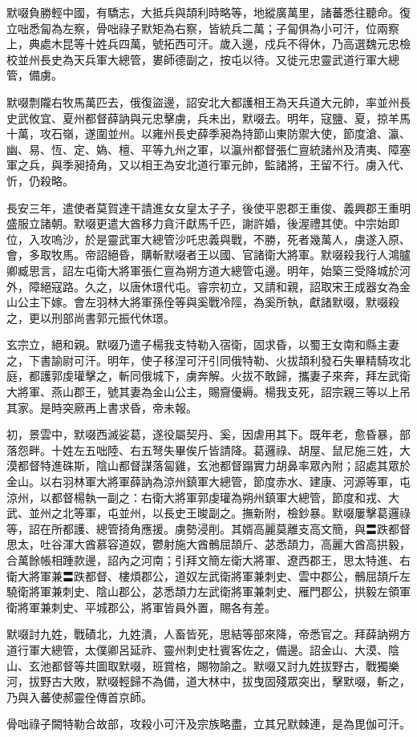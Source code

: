 \begin{pinyinscope}
 默啜負勝輕中國，有驕志，大抵兵與頡利時略等，地縱廣萬里，諸蕃悉往聽命。復立咄悉匐為左察，骨咄祿子默矩為右察，皆統兵二萬；子匐俱為小可汗，位兩察上，典處木昆等十姓兵四萬，號拓西可汗。歲入邊，戍兵不得休，乃高選魏元忠檢校並州長史為天兵軍大總管，婁師德副之，按屯以待。又徙元忠靈武道行軍大總管，備虜。



 默啜剽隴右牧馬萬匹去，俄復盜邊，詔安北大都護相王為天兵道大元帥，率並州長史武攸宜、夏州都督薛訥與元忠擊虜，兵未出，默啜去。明年，寇鹽、夏，掠羊馬十萬，攻石嶺，遂圍並州。以雍州長史薛季昶為持節山東防禦大使，節度滄、瀛、幽、易、恆、定、媯、檀、平等九州之軍，以瀛州都督張仁亶統諸州及清夷、障塞軍之兵，與季昶掎角，又以相王為安北道行軍元帥，監諸將，王留不行。虜入代、忻，仍殺略。



 長安三年，遣使者莫賀達干請進女女皇太子子，後使平恩郡王重俊、義興郡王重明盛服立諸朝。默啜更遣大酋移力貪汗獻馬千匹，謝許婚，後渥禮其使。中宗始即位，入攻嗚沙，於是靈武軍大總管沙吒忠義與戰，不勝，死者幾萬人，虜遂入原、會，多取牧馬。帝詔絕昏，購斬默啜者王以國、官諸衛大將軍。默啜殺我行人鴻臚卿臧思言，詔左屯衛大將軍張仁亶為朔方道大總管屯邊。明年，始築三受降城於河外，障絕寇路。久之，以唐休璟代屯。睿宗初立，又請和親，詔取宋王成器女為金山公主下嫁。會左羽林大將軍孫佺等與奚戰冷陘，為奚所執，獻諸默啜，默啜殺之，更以刑部尚書郭元振代休璟。



 玄宗立，絕和親。默啜乃遣子楊我支特勒入宿衛，固求昏，以蜀王女南和縣主妻之，下書諭尉可汗。明年，使子移涅可汗引同俄特勒、火拔頡利發石失畢精騎攻北庭，都護郭虔瓘擊之，斬同俄城下，虜奔解。火拔不敢歸，攜妻子來奔，拜左武衛大將軍、燕山郡王，號其妻為金山公主，賜齎優縟。楊我支死，詔宗親三等以上吊其家。是時突厥再上書求昏，帝未報。



 初，景雲中，默啜西滅娑葛，遂役屬契丹、奚，因虐用其下。既年老，愈昏暴，部落怨畔。十姓左五咄陸、右五弩失畢俟斤皆請降。葛邏祿、胡屋、鼠尼施三姓，大漠都督特進硃斯，陰山都督謀落匐雞，玄池都督蹋實力胡鼻率眾內附；詔處其眾於金山。以右羽林軍大將軍薛訥為涼州鎮軍大總管，節度赤水、建康、河源等軍，屯涼州，以都督楊執一副之：右衛大將軍郭虔瓘為朔州鎮軍大總管，節度和戎、大武、並州之北等軍，屯並州，以長史王晙副之。撫新附，檢鈔暴。默啜屢擊葛邏祿等，詔在所都護、總管掎角應援。虜勢浸削。其婿高麗莫離支高文簡，與〓跌都督思太，吐谷渾大酋慕容道奴，鬱射施大酋鶻屈頡斤、苾悉頡力，高麗大酋高拱毅，合萬餘帳相踵款邊，詔內之河南；引拜文簡左衛大將軍、遼西郡王，思太特進、右衛大將軍兼〓跌都督、樓煩郡公，道奴左武衛將軍兼刺史、雲中郡公，鶻屈頡斤左驍衛將軍兼刺史、陰山郡公，苾悉頡力左武衛將軍兼刺史、雁門郡公，拱毅左領軍衛將軍兼刺史、平城郡公，將軍皆員外置，賜各有差。



 默啜討九姓，戰磧北，九姓潰，人畜皆死，思結等部來降，帝悉官之。拜薛訥朔方道行軍大總管，太僕卿呂延祚、靈州刺史杜賓客佐之，備邊。詔金山、大漠、陰山、玄池都督等共圖取默啜，班賞格，賜物諭之。默啜又討九姓拔野古，戰獨樂河，拔野古大敗，默啜輕歸不為備，道大林中，拔曳固殘眾突出，擊默啜，斬之，乃與入蕃使郝靈佺傳首京師。



 骨咄祿子闕特勒合故部，攻殺小可汗及宗族略盡，立其兄默棘連，是為毘伽可汗。



\end{pinyinscope}